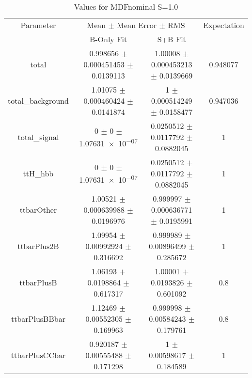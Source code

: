 \begin{table}
\centering
\caption{Values for MDFnominal S=1.0}
\begin{tabular}{cccc}
\toprule
Parameter & \multicolumn{2}{c}{Mean $\pm$ Mean Error $\pm$ RMS} & Expectation\\
 & B-Only Fit & S+B Fit & \\
\midrule
total & \num{0.998656} $\pm$ \num{0.000451453} $\pm$ \num{0.0139113} & \num{1.00008} $\pm$ \num{0.000453213} $\pm$ \num{0.0139669} & \num{0.948077}\\
total\_background & \num{1.01075} $\pm$ \num{0.000460424} $\pm$ \num{0.0141874} & \num{1} $\pm$ \num{0.000514249} $\pm$ \num{0.0158477} & \num{0.947036}\\
total\_signal & \num{0} $\pm$ \num{0} $\pm$ \num{1.07631e-07} & \num{0.0250512} $\pm$ \num{0.0117792} $\pm$ \num{0.0882045} & \num{1}\\
ttH\_hbb & \num{0} $\pm$ \num{0} $\pm$ \num{1.07631e-07} & \num{0.0250512} $\pm$ \num{0.0117792} $\pm$ \num{0.0882045} & \num{1}\\
ttbarOther & \num{1.00521} $\pm$ \num{0.000639988} $\pm$ \num{0.0196976} & \num{0.999997} $\pm$ \num{0.000636771} $\pm$ \num{0.0195991} & \num{1}\\
ttbarPlus2B & \num{1.09954} $\pm$ \num{0.00992924} $\pm$ \num{0.316692} & \num{0.999989} $\pm$ \num{0.00896499} $\pm$ \num{0.285672} & \num{1}\\
ttbarPlusB & \num{1.06193} $\pm$ \num{0.0198864} $\pm$ \num{0.617317} & \num{1.00001} $\pm$ \num{0.0193826} $\pm$ \num{0.601092} & \num{0.8}\\
ttbarPlusBBbar & \num{1.12469} $\pm$ \num{0.00552305} $\pm$ \num{0.169963} & \num{0.999998} $\pm$ \num{0.00584243} $\pm$ \num{0.179761} & \num{0.8}\\
ttbarPlusCCbar & \num{0.920187} $\pm$ \num{0.00555488} $\pm$ \num{0.171298} & \num{1} $\pm$ \num{0.00598617} $\pm$ \num{0.184589} & \num{1}\\
\bottomrule
\end{tabular}
\end{table}